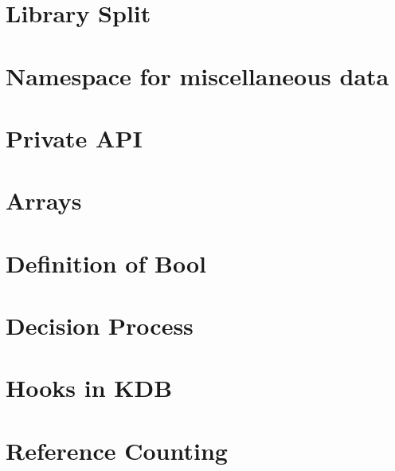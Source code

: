 \let\mypdfximage\pdfximage\def\pdfximage{\immediate\mypdfximage}\documentclass[twoside]{book}
\newcommand{\+}{\discretionary{\mbox{\scriptsize$\hookleftarrow$}}{}{}}
\begin{document}
\chapter{Library Split}
\label{doc_decisions_4_decided_library_split_md}

\chapter{Namespace for miscellaneous data}
\label{doc_decisions_4_decided_misc_namespace_md}

\chapter{Private API}
\label{doc_decisions_4_decided_private_api_md}

\chapter{Arrays}
\label{doc_decisions_5_partially_implemented_array_md}

\chapter{Definition of Bool}
\label{doc_decisions_5_partially_implemented_boolean_md}

\chapter{Decision Process}
\label{doc_decisions_5_partially_implemented_decision_process_md}

\chapter{Hooks in KDB}
\label{doc_decisions_5_partially_implemented_hooks_md}

\chapter{Reference Counting}
\label{doc_decisions_5_partially_implemented_reference_counting_md}

\end{document}
